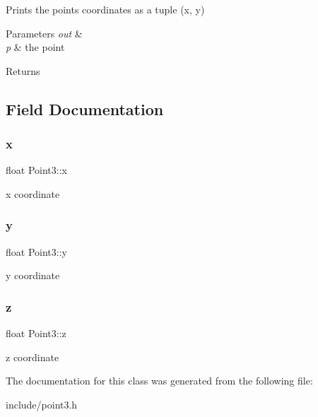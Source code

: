 Prints the point\textquotesingle{}s coordinates as a tuple (x, y) 


\begin{DoxyParams}{Parameters}
{\em out} & \\
\hline
{\em p} & the point \\
\hline
\end{DoxyParams}
\begin{DoxyReturn}{Returns}

\end{DoxyReturn}


\subsection{Field Documentation}
\mbox{\label{class_point3_a12b90b9f335499323488109dfef2c46a}} 
\subsubsection{\texorpdfstring{x}{x}}
{\footnotesize\ttfamily float Point3\+::x}



x coordinate 

\mbox{\label{class_point3_a9435368d0f1118d35f751aa1d4e4d4e5}} 
\subsubsection{\texorpdfstring{y}{y}}
{\footnotesize\ttfamily float Point3\+::y}



y coordinate 

\mbox{\label{class_point3_a56a0faf09fb6bd6602f157c6dd3db7ff}} 
\subsubsection{\texorpdfstring{z}{z}}
{\footnotesize\ttfamily float Point3\+::z}



z coordinate 



The documentation for this class was generated from the following file\+:\begin{DoxyCompactItemize}
\item 
include/point3.\+h\end{DoxyCompactItemize}
